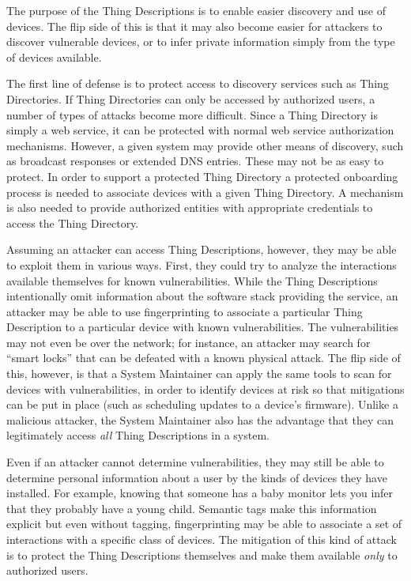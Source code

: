The purpose of the Thing Descriptions is to enable easier discovery and use of 
devices.  The flip side of this is that it may also become easier
for attackers to discover vulnerable devices, or to infer private information
simply from the type of devices available.

The first line of defense is to protect access to discovery services such
as Thing Directories.  If Thing Directories can only be accessed by authorized
users, a number of types of attacks become more difficult.  Since a Thing
Directory is simply a web service, it can be protected with normal web service
authorization mechanisms.  
However, a given system may provide other means of 
discovery, such as broadcast responses or extended DNS entries.
These may not be as easy to protect.
In order to support a protected Thing Directory
a protected onboarding process is needed to associate devices with a given
Thing Directory.
A mechanism is also needed to provide authorized entities with appropriate
credentials to access the Thing Directory.

Assuming an attacker can access Thing Descriptions, however, they may be
able to exploit them in various ways.  First, they could try to analyze the 
interactions available themselves for known vulnerabilities.  While the 
Thing Descriptions intentionally omit information about the software stack
providing the service, an attacker may be able to use fingerprinting to
associate a particular Thing Description to a particular device with known
vulnerabilities.  The vulnerabilities may not even be over the network;
for instance, an attacker may search for ``smart locks'' that can be defeated
with a known physical attack.
The flip side of this, however, is that a System Maintainer can apply the same
tools to scan for devices with vulnerabilities, in order to identify devices
at risk so that mitigations can be put in place (such as scheduling updates to
a device's firmware).
Unlike a malicious attacker, the System Maintainer also has the advantage that
they can legitimately access \emph{all} Thing Descriptions in a system.

Even if an attacker cannot determine vulnerabilities, they may still be able
to determine personal information about a user by the kinds of devices they
have installed.  For example, knowing that someone has a baby monitor lets you
infer that they probably have a young child.
Semantic tags make this information explicit but even without tagging,
fingerprinting may be able to associate a set of interactions with
a specific class of devices.  The mitigation of this kind of attack is to
protect the Thing Descriptions themselves and make them available
\emph{only} to authorized users.
